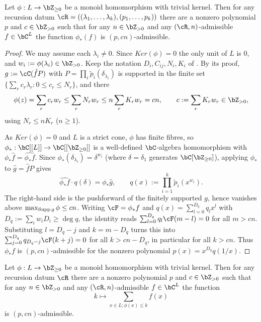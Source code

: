\documentclass[12pt,a4paper]{amsart}%
\newcommand{\RamiE}[1]{{{#1}}}
\begin{document}
 
 \begin{cor}\label{cor:pushforward}
 Let $\phi:L\to \Z_{\geq 0}$ be a monoid homomorphism with trivial kernel. Then for any recursion datum $\cR=((\lambda_1,\dots,\lambda_k),(p_1,\dots,p_k))$ there are a nonzero polynomial $p$ and $c\in\Z_{> 0}$  such that for any $n\in \Z_{>0}$ and any $(\cR,n)$-admissible $f\in \C^L$ the function  $\phi_*(f)$ is $(p,cn)$-admissible.
  \end{cor}
 \begin{proof}
 \RamiE{We may assume each $\lambda_i\neq0$.}
 Since $Ker(\phi)=0$ the only unit of $L$ is $0$, and $w_i:=\phi(\lambda_i)\in\Z_{>0}$. Keep the notation $D_i,C_{ij},N_i,K_i$ of . By its proof, $g:=\cC(\hat fP)$ with $P=\prod_i\tilde p_i(\delta_{\lambda_i})$ is supported in the finite set $\{\sum_r c_r\lambda_r:0\leq c_r\leq N_r\}$, and there
 $$\phi(z)=\sum_r c_rw_r\leq\sum_r N_rw_r\leq n\sum_r K_rw_r=cn,\qquad c:=\sum_r K_rw_r\in\Z_{>0},$$
 using $N_r\leq nK_r$ ($n\geq1$).

 As $Ker(\phi)=0$ and $L$ is a strict cone, $\phi$ has finite fibres, so $\phi_*:\C[[L]]\to\C[[\Z_{\geq0}]]$ is a well-defined $\C$-algebra homomorphism with $\phi_*\hat f=\widehat{\phi_*f}$. Since $\phi_*(\delta_{\lambda_i})=\delta^{w_i}$ (where $\delta=\delta_1$ generates $\C[\Z_{\geq0}]$), applying $\phi_*$ to $\hat g=\hat fP$ gives
 $$\widehat{\phi_*f}\cdot q(\delta)=\phi_*\hat g,\qquad q(x):=\prod_{i=1}^k\tilde p_i(x^{w_i}).$$
 The right-hand side is the pushforward of the finitely supported $g$, hence vanishes above $\max_{\operatorname{Supp} g}\phi\leq cn$. Writing $\cF=\phi_*f$ and $q(x)=\sum_{l=0}^{D_q}q_lx^l$ with $D_q:=\sum_iw_iD_i\geq\deg q$, the identity reads $\sum_{l=0}^{D_q} q_l\cF(m-l)=0$ for all $m>cn$. Substituting $l=D_q-j$ and $k=m-D_q$ turns this into $\sum_{j=0}^{D_q} q_{D_q-j}\cF(k+j)=0$ for all $k>cn-D_q$, in particular for all $k>cn$. Thus $\phi_*f$ is $(p,cn)$-admissible for the nonzero polynomial $p(x)=x^{D_q} q(1/x)$.
 \end{proof}
 \begin{cor}\label{cor:acc_pushforward}
 Let $\phi:L\to \Z_{\geq 0}$ be a monoid homomorphism with trivial kernel. Then for any recursion datum $\cR$ there are a nonzero polynomial $p$ and $c\in\Z_{> 0}$  such that for any $n\in \Z_{>0}$ and any $(\cR,n)$-admissible $f\in \C^L$ the function   
 $$k\mapsto \sum_{x\in L; \phi(x)\leq k} f(x)$$ is $(p,cn)$-admissible.
  \end{cor}
\end{document}
